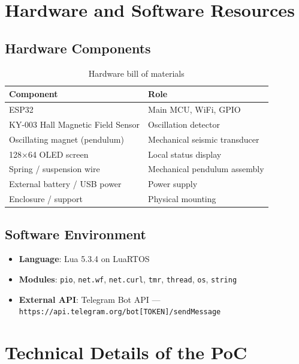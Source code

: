 \documentclass[11pt,a4paper]{article}
\begin{document}
\section{Hardware and Software Resources}

\subsection{Hardware Components}

\begin{table}[h!]
\centering
\begin{tabular}{ll}
\toprule
\textbf{Component} & \textbf{Role} \\
\midrule
ESP32 & Main MCU, WiFi, GPIO \\
KY-003 Hall Magnetic Field Sensor & Oscillation detector \\
Oscillating magnet (pendulum) & Mechanical seismic transducer \\
128×64 OLED screen & Local status display \\
Spring / suspension wire & Mechanical pendulum assembly \\
External battery / USB power & Power supply \\
Enclosure / support & Physical mounting \\
\bottomrule
\end{tabular}
\caption{Hardware bill of materials}
\end{table}

\subsection{Software Environment}
\begin{itemize}[noitemsep]
  \item \textbf{Language}: Lua 5.3.4 on LuaRTOS
  \item \textbf{Modules}: \texttt{pio}, \texttt{net.wf}, \texttt{net.curl}, \texttt{tmr}, \texttt{thread}, \texttt{os}, \texttt{string}
  \item \textbf{External API}: Telegram Bot API — \texttt{https://api.telegram.org/bot[TOKEN]/sendMessage}
\end{itemize}

\section{Technical Details of the PoC}
\end{document}
